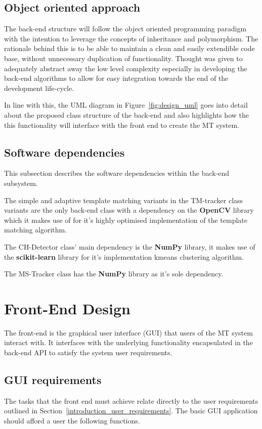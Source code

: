 \subsection{Object oriented approach}
The back-end structure will follow the object oriented programming paradigm with
the intention to leverage the concepts of inheritance and polymorphism. The
rationale behind this is to be able to maintain a clean and easily extendible
code base, without unnecessary duplication of functionality. Thought was given
to adequately abstract away the low level complexity especially in developing
the back-end algorithms to allow for easy integration towards the end of the
development life-cycle. 

In line with this, the UML diagram in Figure~\ref{fig:design_uml} goes into
detail about the proposed class structure of the back-end and also highlights how the 
this functionality will interface with the front end to create the MT system.


\subsection{Software dependencies}
This subsection describes the software dependencies within the back-end
subsystem.

The simple and adaptive template matching variants in the TM-tracker class
variants are the only back-end class with a dependency on the \textbf{OpenCV}
library which it makes use of for it's highly optimised implementation of the
template matching algorithm.

The CH-Detector class' main dependency is the \textbf{NumPy} library, it makes
use of the \textbf{scikit-learn} library for it's implementation kmeans clustering
algorithm.

The MS-Tracker class has the \textbf{NumPy} library as it's sole dependency.

\section{Front-End Design}
The front-end is the graphical user interface (GUI) that users of the MT
system interact with. 
It interfaces with the underlying functionality encapsulated in the back-end API to
satisfy the system user requirements. 

\subsection{GUI requirements}
The tasks that the front end must achieve relate directly to the user
requirements outlined in Section~\ref{introduction_user_requirements}. The basic
GUI application should afford a user the following functions.  

